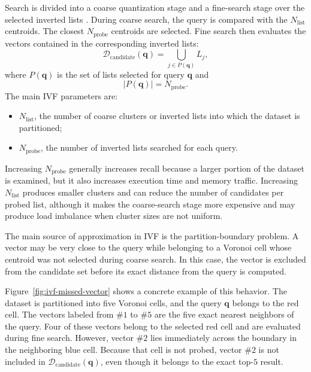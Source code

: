 Search is divided into a coarse quantization stage and a fine-search stage over the selected inverted lists \cite{faiss}. During coarse search, the query is compared with the \(N_{\mathrm{list}}\) centroids. The closest \(N_{\mathrm{probe}}\) centroids are selected. Fine search then evaluates the vectors contained in the corresponding inverted lists:
\begin{equation}
\mathcal{D}_{\mathrm{candidate}}(\mathbf{q})=\bigcup_{j\in P(\mathbf{q})}L_j,
\end{equation}
where \(P(\mathbf{q})\) is the set of lists selected for query \(\mathbf{q}\) and
\begin{equation}
\left|P(\mathbf{q})\right|=N_{\mathrm{probe}}.
\end{equation}
\newline
The main IVF parameters are:
\begin{itemize}
\item \(N_{\mathrm{list}}\), the number of coarse clusters or inverted lists into which the dataset is partitioned;
\item \(N_{\mathrm{probe}}\), the number of inverted lists searched for each query.
\end{itemize}

Increasing \(N_{\mathrm{probe}}\) generally increases recall because a larger portion of the dataset is examined, but it also increases execution time and memory traffic. Increasing \(N_{\mathrm{list}}\) produces smaller clusters and can reduce the number of candidates per probed list, although it makes the coarse-search stage more expensive and may produce load imbalance when cluster sizes are not uniform.

The main source of approximation in IVF is the partition-boundary problem. A vector may be very close to the query while belonging to a Voronoi cell whose centroid was not selected during coarse search. In this case, the vector is excluded from the candidate set before its exact distance from the query is computed.

Figure~\ref{fig:ivf-missed-vector} shows a concrete example of this behavior. The dataset is partitioned into five Voronoi cells, and the query \(\mathbf{q}\) belongs to the red cell. The vectors labeled from \(\#1\) to \(\#5\) are the five exact nearest neighbors of the query. Four of these vectors belong to the selected red cell and are evaluated during fine search. However, vector \(\#2\) lies immediately across the boundary in the neighboring blue cell. Because that cell is not probed, vector \(\#2\) is not included in \(\mathcal{D}_{\mathrm{candidate}}(\mathbf{q})\), even though it belongs to the exact top-\(5\) result.

